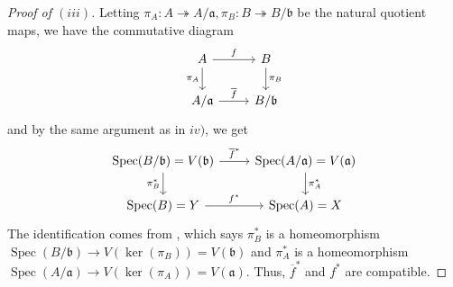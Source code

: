 \documentclass[12pt,letterpaper]{article}
\theoremstyle{definition}
\theoremstyle{remark}
\numberwithin{equation}{section}
\numberwithin{figure}{problem}
\DeclareMathOperator{\Spec}{Spec}
\begin{document}
\begin{proof}[Proof of $(iii)$]
  Letting $\pi_A : A \twoheadrightarrow A/\mathfrak{a},\pi_B : B \twoheadrightarrow B/\mathfrak{b}$ be the natural quotient maps, we have the commutative diagram
  \begin{equation*}
    \begin{tikzcd}
      A \arrow{r}{f}\arrow{d}[swap]{\pi_A} & B \arrow{d}{\pi_B}\\
      A/\mathfrak{a} \arrow{r}{\overline{f}} & B/\mathfrak{b}
    \end{tikzcd}
  \end{equation*}
  and by the same argument as in $iv)$, we get
  \begin{equation*}
    \begin{tikzcd}
      \Spec(B/\mathfrak{b}) = V(\mathfrak{b}) \arrow{r}{\overline{f}^*}\arrow{d}[swap]{\pi_B^*} & \Spec(A/\mathfrak{a}) = V(\mathfrak{a}) \arrow{d}{\pi_A^*}\\
      \Spec(B) = Y \arrow{r}{f^*} & \Spec(A) = X
    \end{tikzcd}
  \end{equation*}
  The identification comes from \cite[1.21iv]{AM69}, which says $\pi_B^*$ is a homeomorphism $\Spec(B/\mathfrak{b}) \to V(\ker(\pi_B)) = V(\mathfrak{b})$ and $\pi_A^*$ is a homeomorphism $\Spec(A/\mathfrak{a}) \to V(\ker(\pi_A)) = V(\mathfrak{a})$. Thus, $\overline{f}^*$ and $f^*$ are compatible.
\end{proof}
\end{document}

